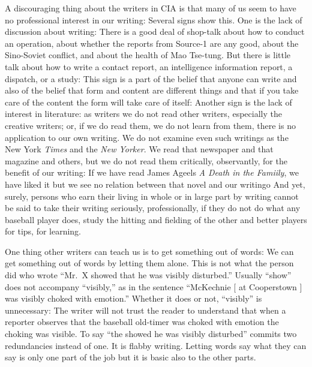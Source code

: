 \documentclass[
    oneside,
    11pt,
]{memoir}
\begin{document}
A discouraging thing about the writers in CIA is that many of us seem to have no professional interest in our writing: Several signs show this. One is the lack of discussion about writing: There is a good deal of shop-talk about how to conduct an operation, about whether the reports from Source-1 are any good, about the Sino-Soviet conflict, and about the health of Mao Tse-tung. But there is little talk about how to write a contact report, an intelligence information report, a dispatch, or a study: This sign is a part of the belief that anyone can write and also of the belief that form and content are different things and that if you take care of the content the form will take care of itself: Another sign is the lack of interest in literature: as writers we do not read other writers, especially the creative writers; or, if we do read them, we do not learn from them, there is no application to our own writing. We do not examine even such writings as the New York \emph{Times} and the \emph{New Yorker}. We read that newspaper and that magazine and others, but we do not read them critically, observantly, for the benefit of our writing: If we have read James Ageels \emph{A Death in the Famiily}, we have liked it but we see no relation between that novel and our writingo And yet, surely, persons who earn their living in whole or in large part by writing cannot be said to take their writing seriously, professionally, if they do not do what any baseball player does, study the hitting and fielding of the other and better players for tips, for learning.

One thing other writers can teach us is to get something out of words: We can get something out of words by letting them alone. This is not what the person did who wrote \enquote{Mr.\ X showed that he was visibly disturbed.} Usually \enquote{show} does not accompany \enquote{visibly,} as in the sentence \enquote{McKechnie [ at Cooperstown ] was visibly choked with emotion.} Whether it does or not, \enquote{visibly} is unnecessary: The writer will not trust the reader to understand that when a reporter observes that the baseball old-timer was choked with emotion the choking was visible. To say \enquote{the showed he was visibly disturbed} commits two redundancies instead of one. It is flabby writing. Letting words say what they can say is only one part of the job but it is basic also to the other parts.
\end{document}
